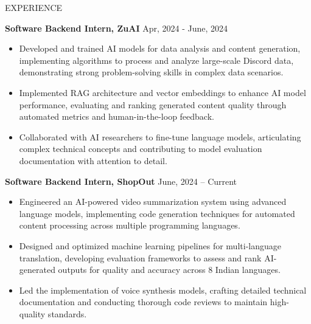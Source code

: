 \documentclass{resume} %
\begin{document}
\begin{rSection}{EXPERIENCE}

   \textbf{Software Backend Intern, ZuAI} \hfill Apr, 2024 - June, 2024
   \vspace{-1.5mm}
   \begin{itemize}
       \item Developed and trained AI models for data analysis and content generation, implementing algorithms to process and analyze large-scale Discord data, demonstrating strong problem-solving skills in complex data scenarios.
       \vspace{-2mm}
       \item Implemented RAG architecture and vector embeddings to enhance AI model performance, evaluating and ranking generated content quality through automated metrics and human-in-the-loop feedback.
       \vspace{-2mm}
       \item Collaborated with AI researchers to fine-tune language models, articulating complex technical concepts and contributing to model evaluation documentation with attention to detail.
   \end{itemize}
   
    \vspace{-1.5mm}
    \textbf{Software Backend Intern, ShopOut} \hfill June, 2024 -- Current
   \vspace{-1.5mm}
   \begin{itemize}
       \item Engineered an AI-powered video summarization system using advanced language models, implementing code generation techniques for automated content processing across multiple programming languages.
       \vspace{-2mm}
       \item Designed and optimized machine learning pipelines for multi-language translation, developing evaluation frameworks to assess and rank AI-generated outputs for quality and accuracy across 8 Indian languages.
       \vspace{-2mm}
       \item Led the implementation of voice synthesis models, crafting detailed technical documentation and conducting thorough code reviews to maintain high-quality standards.
   \end{itemize}
   
   \end{rSection}
\end{document}
